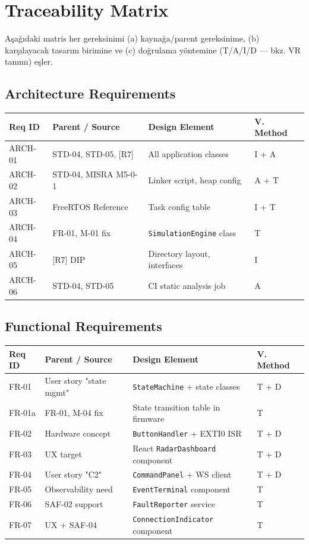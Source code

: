 \section{Traceability Matrix}

Aşağıdaki matris her gereksinimi (a) kaynağa/parent gereksinime, (b) karşılayacak tasarım birimine ve (c) doğrulama yöntemine (T/A/I/D — bkz. VR tanımı) eşler.

\subsection{Architecture Requirements}
\begin{center}
\begin{tabular}{|l|l|l|l|}
\hline
\textbf{Req ID} & \textbf{Parent / Source} & \textbf{Design Element} & \textbf{V. Method} \\
\hline
ARCH-01 & STD-04, STD-05, [R7] & All application classes & I + A \\
ARCH-02 & STD-04, MISRA M5-0-1 & Linker script, heap config & A + T \\
ARCH-03 & FreeRTOS Reference & Task config table & I + T \\
ARCH-04 & FR-01, M-01 fix & \texttt{SimulationEngine} class & T \\
ARCH-05 & [R7] DIP & Directory layout, interfaces & I \\
ARCH-06 & STD-04, STD-05 & CI static analysis job & A \\
\hline
\end{tabular}
\end{center}

\subsection{Functional Requirements}
\begin{center}
\begin{tabular}{|l|l|l|l|}
\hline
\textbf{Req ID} & \textbf{Parent / Source} & \textbf{Design Element} & \textbf{V. Method} \\
\hline
FR-01   & User story "state mgmt" & \texttt{StateMachine} + state classes & T + D \\
FR-01a  & FR-01, M-04 fix & State transition table in firmware & T \\
FR-02   & Hardware concept & \texttt{ButtonHandler} + EXTI0 ISR & T + D \\
FR-03   & UX target & React \texttt{RadarDashboard} component & T + D \\
FR-04   & User story "C2" & \texttt{CommandPanel} + WS client & T + D \\
FR-05   & Observability need & \texttt{EventTerminal} component & T \\
FR-06   & SAF-02 support & \texttt{FaultReporter} service & T \\
FR-07   & UX + SAF-04 & \texttt{ConnectionIndicator} component & T \\
\hline
\end{tabular}
\end{center}

